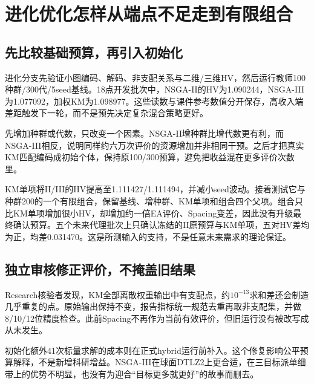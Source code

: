 \section{进化优化怎样从端点不足走到有限组合}
\subsection{先比较基础预算，再引入初始化}
进化分支先验证小图编码、解码、非支配关系与二维/三维HV，然后运行教师100种群/300代/5seed基线。18点开发批次中，NSGA-II的HV为1.090244，NSGA-III为1.077092，加权KM为1.098977。这些读数与课件参考数值分开保存，高收入端差距触发下一轮，而不是预先决定复杂混合策略更好。

先增加种群或代数，只改变一个因素。NSGA-II增种群比增代数更有利，而NSGA-III相反，说明同样约六万次评价的资源增加并非相同干预。之后才把真实KM匹配编码成初始个体，保持原100/300预算，避免把收益混在更多评价次数里。

KM单项将II/III的HV提高至1.111427/1.111494，并减小seed波动。接着测试它与种群200的一个有限组合，保留基线、增种群、KM单项和组合四个父项。组合只比KM单项增加很小HV，却增加约一倍EA评价、Spacing变差，因此没有升级最终确认预算。五个未来代理批次上只确认冻结的II原预算与KM单项，五对HV差均为正，均差0.031470。这是所测输入的支持，不是任意未来需求的理论保证。

\subsection{独立审核修正评价，不掩盖旧结果}
Research核验者发现，KM全部离散权重输出中有支配点，约$10^{-13}$求和差还会制造几乎重复的点。原始输出保持不变，报告指标统一规范去重再取非支配集，并做8/10/12位精度检查。此前Spacing不再作为当前有效评价，但旧运行没有被改写成从未发生。

初始化额外41次标量求解的成本则在正式hybrid运行前补入。这个修复影响公平预算解释，不是新增科研增益。NSGA-III在球面DTLZ2上更合适，在三目标派单细带上的优势不明显，也没有为迎合“目标更多就更好”的故事而删去。
